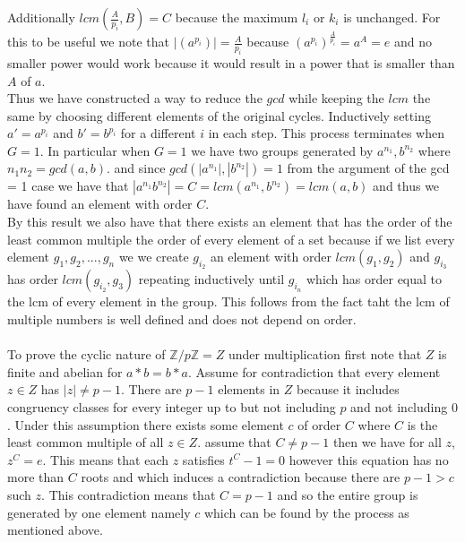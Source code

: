 \documentclass{article}
\begin{document}
    Additionally $lcm(\frac{A}{p_i}, B) = C$ because the maximum $l_i$ or $k_i$ is unchanged.
    For this to be useful we note that $|(a^{p_i})| = \frac{A}{p_i}$ because $(a^{p_i})^{\frac{A}{p_i}} = a^{A} = e$ and no smaller power would work
    because it would result in a power that is smaller than $A$ of $a$. 
    \\
    Thus we have constructed a way to reduce the $gcd$ while keeping the $lcm$ the same by choosing different elements of the original cycles.
    Inductively setting $a' = a^{p_i}$ and $b' = b^{p_i}$ for a different $i$ in each step. This process terminates when $G = 1$.
    In particular when $G = 1$ we have two groups generated by $a^{n_1},b^{n_2}$ where $n_1n_2 = gcd(a,b)$. and since $gcd(|a^{n_1}|,|b^{n_2}|) = 1$ from the argument 
    of the gcd = 1 case we have that $|a^{n_1}b^{n_2}| = C = lcm(a^{n_1},b^{n_2}) = lcm(a,b)$ and thus we have found an element with order $C$.
    \\
    By this result we also have that there exists an element that has the order of the least common multiple the order of every element of a set because if we list every element
    $g_1,g_2,...,g_n$ we we create $g_{i_2}$ an element with order $lcm(g_1,g_2)$ and $g_{i_3}$ has order $lcm(g_{i_2},g_3)$ repeating inductively until $g_{i_n}$ which has order equal to the lcm of every element in the group.
    This follows from the fact taht the lcm of multiple numbers is well defined and does not depend on order.
    \\
    \\
    To prove the cyclic nature of $ \mathbb{Z} / p \mathbb{Z}  = Z$ under multiplication first note that $Z$ is finite and abelian for $a*b = b*a$. Assume for contradiction that every element $z \in Z$ has  $|z| \ne p-1$. There are
    $p-1$ elements in $Z$ because it includes congruency classes for every integer up to but not including $p$ and not including $0$. Under this assumption there exists some element $c$ of order
    $C$ where $C$ is the least common multiple of all $z \in Z$.
    assume that $C \ne p-1$ then we have for all $z$, $z^{C} = e$. This means that each $z$  satisfies $t^{C} -1 =0$ however this equation has no more than $C$ roots and
    which induces a contradiction because there are $p-1 > c$ such $z$. This contradiction means that $C = p-1$ and so the entire group is generated by one element namely $c$ which can be found by the process as mentioned above.
\end{document}

